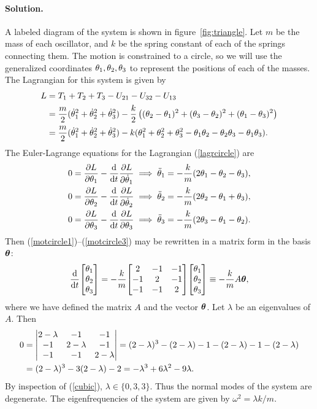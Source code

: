 \documentclass[11pt]{article}
\newcommand{\refeq}[1]{(\ref{#1})}
\newenvironment{solution}
{
    \paragraph{Solution.}
    \ignorespaces
}
{
    \bigskip
}
\begin{document}
\begin{solution}
	A labeled diagram of the system is shown in figure~\ref{fig:triangle}.  Let $m$ be the mass of each oscillator, and $k$ be the spring constant of each of the springs connecting them.  The motion is constrained to a circle, so we will use the generalized coordinates $\theta_1, \theta_2, \theta_3$ to represent the positions of each of the masses.  The Lagrangian for this system is given by
	\begin{align}
		L &= T_1 + T_2 + T_3 - U_{21} - U_{32} - U_{13} \\
		&= \frac{m}{2} (\dot{\theta}_1^2 + \dot{\theta}_2^2 + \dot{\theta}_3^2) - \frac{k}{2} \left( (\theta_2 - \theta_1)^2 + (\theta_3 - \theta_2)^2 + (\theta_1 - \theta_3)^2 \right) \\
		&= \frac{m}{2} (\dot{\theta}_1^2 + \dot{\theta}_2^2 + \dot{\theta}_3^2) - k (\theta_1^2 + \theta_2^2 + \theta_3^2 - \theta_1 \theta_2 - \theta_2 \theta_3 - \theta_1 \theta_3). \label{lagrcircle}
	\end{align}
	The Euler-Lagrange equations for the Lagrangian \refeq{lagrcircle} are
	\begin{align}
		0 = \pdv{L}{\theta_1} - \dv{}{t} \pdv{L}{\dot{\theta}_1} &\implies \ddot{\theta}_1 = -\frac{k}{m} (2 \theta_1 - \theta_2 - \theta_3), \label{motcircle1} \\
		0 = \pdv{L}{\theta_2} - \dv{}{t} \pdv{L}{\dot{\theta}_2} &\implies \ddot{\theta}_2 = -\frac{k}{m} (2 \theta_2 - \theta_1 + \theta_3), \label{motcircle2} \\
		0 = \pdv{L}{\theta_3} - \dv{}{t} \pdv{L}{\theta_3} &\implies \ddot{\theta}_3 = -\frac{k}{m} (2 \theta_3 - \theta_1 - \theta_2). \label{motcircle3}
	\end{align}
	Then \refeq{motcircle1}--\refeq{motcircle3} may be rewritten in a matrix form in the basis $\boldsymbol{\theta}$:
	\begin{equation}
		\dv{}{t} \mqty[ \thq \\ \thw \\ \te ] = -\frac{k}{m} \mqty[ 2 & -1 & -1 \\ -1 & 2 & -1 \\ -1 & -1 & 2 ] \mqty[ \thq \\ \thw \\ \te ] \equiv -\frac{k}{m} A \vth,
	\end{equation}
	where we have defined the matrix $A$ and the vector $\boldsymbol{\theta}$.  Let $\lambda$ be an eigenvalues of $A$.  Then
	\begin{align}
		0 &= \mdet{2 - \lambda & -1 & -1 \\ -1 & 2 - \lambda & -1 \\ -1 & -1 & 2 - \lambda} = (2 - \lambda)^3 - (2 - \lambda) - 1 - (2 - \lambda) - 1 - (2 - \lambda) \\
		&= (2 - \lambda)^3 - 3 (2 - \lambda) - 2 = -\lambda^3 + 6 \lambda^2 - 9 \lambda. \label{cubic}
	\end{align}
	By inspection of \refeq{cubic}, $\lambda \in \{ 0, 3, 3 \}$.  Thus the normal modes of the system are degenerate.  The eigenfrequencies of the system are given by $\omega^2 = \lambda k / m$.
	

\end{solution}
\end{document}
